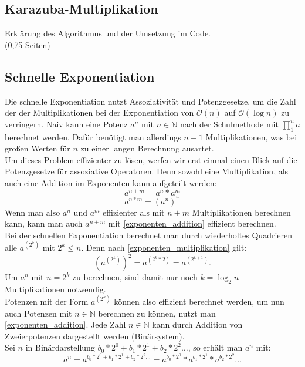 \documentclass[course=erap]{aspdoc}
\begin{document}
\subsection{Karazuba-Multiplikation} \label{sec:karazuba}
Erklärung des Algorithmus und der Umsetzung im Code. \\
(0,75 Seiten)

\subsection{Schnelle Exponentiation} \label{sec:schnelle_exponentiation}
Die schnelle Exponentiation nutzt Assoziativität und Potenzgesetze, um die Zahl der der Multiplikationen bei der Exponentiation von $\mathcal{O}(n)$ auf $\mathcal{O}(\log{}n)$ zu verringern. 
Naiv kann eine Potenz $a^n$ mit $n\in\mathbb{N}$ nach der Schulmethode mit \(\prod_{1}^{n} a \) berechnet werden. Dafür benötigt man allerdings $n-1$ Multiplikationen, was bei großen Werten für $n$ zu einer langen Berechnung ausartet.\\
Um dieses Problem effizienter zu lösen, werfen wir erst einmal einen Blick auf die Potenzgesetze für assoziative Operatoren. Denn sowohl eine Multiplikation, als auch eine Addition im Exponenten kann aufgeteilt werden:
\begin{equation}\label{exponenten_addition}
    a^{n+m} = a^n * a^m
\end{equation}
\begin{equation}\label{exponenten_multiplikation}
    a^{n*m} = (a^n)^{^m}
\end{equation}
Wenn man also $a^n$ und $a^m$ effizienter als mit $n+m$ Multiplikationen berechnen kann, kann man auch $a^{n+m}$ mit \ref{exponenten_addition} effizient berechnen.\\
Bei der schnellen Exponentiation berechnet man durch wiederholtes Quadrieren alle $a^{(2^k)}$ mit $2^k \le n$. Denn nach \ref{exponenten_multiplikation} gilt:
\[ {\left( a^{(2^k)} \right)}^2 = a^{(2^k*2)} = a^{(2^{k+1})}.\]
Um $a^n$ mit $n=2^k$ zu berechnen, sind damit nur noch $k=\log_2n$ Multiplikationen notwendig.
\\Potenzen mit der Form $a^{(2^k)}$ können also effizient berechnet werden, um nun auch Potenzen mit $n\in\mathbb{N}$ berechnen zu können, nutzt man \ref{exponenten_addition}. 
Jede Zahl $n\in\mathbb{N}$ kann durch Addition von Zweierpotenzen dargestellt werden (Binärsystem). \\
Sei $n$ in Binärdarstellung $b_0*2^0+b_1*2^1+b_2*2^2\dots$, so erhält man $a^n$ mit:
\[ a^n = a^{b_0*2^0+b_1*2^1+b_2*2^2\dots} = a^{b_0*2^0} * a^{b_1*2^1} * a^{b_2*2^2} \dots \]
\end{document}
